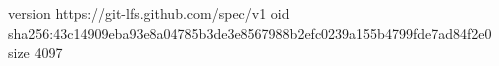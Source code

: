 version https://git-lfs.github.com/spec/v1
oid sha256:43c14909eba93e8a04785b3de3e8567988b2efc0239a155b4799fde7ad84f2e0
size 4097
